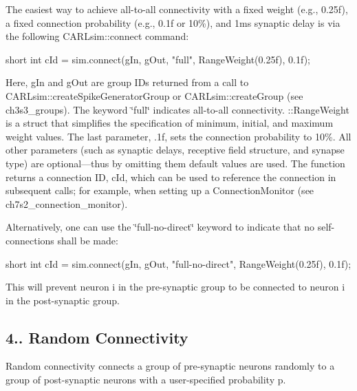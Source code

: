 The easiest way to achieve all-\/to-\/all connectivity with a fixed weight (e.\+g., 0.\+25f), a fixed connection probability (e.\+g., 0.\+1f or 10\%), and 1ms synaptic delay is via the following C\+A\+R\+Lsim\+::connect command\+: 
\begin{DoxyCode}
\textcolor{keywordtype}{short} \textcolor{keywordtype}{int} cId = sim.connect(gIn, gOut, \textcolor{stringliteral}{"full"}, RangeWeight(0.25f), 0.1f);
\end{DoxyCode}
 Here, {\ttfamily g\+In} and {\ttfamily g\+Out} are group I\+Ds returned from a call to C\+A\+R\+Lsim\+::create\+Spike\+Generator\+Group or C\+A\+R\+Lsim\+::create\+Group (see ch3s3\+\_\+groups). The keyword \char`\"{}full\char`\"{} indicates all-\/to-\/all connectivity. \+::\+Range\+Weight is a struct that simplifies the specification of minimum, initial, and maximum weight values. The last parameter, {.\+1f}, sets the connection probability to 10\%. All other parameters (such as synaptic delays, receptive field structure, and synapse type) are optional---thus by omitting them default values are used. The function returns a connection ID, {\ttfamily c\+Id}, which can be used to reference the connection in subsequent calls; for example, when setting up a Connection\+Monitor (see ch7s2\+\_\+connection\+\_\+monitor).

Alternatively, one can use the \char`\"{}full-\/no-\/direct\char`\"{} keyword to indicate that no self-\/connections shall be made\+: 
\begin{DoxyCode}
\textcolor{keywordtype}{short} \textcolor{keywordtype}{int} cId = sim.connect(gIn, gOut, \textcolor{stringliteral}{"full-no-direct"}, RangeWeight(0.25f), 0.1f);
\end{DoxyCode}
 This will prevent neuron {\ttfamily i} in the pre-\/synaptic group to be connected to neuron {\ttfamily i} in the post-\/synaptic group.\hypertarget{ch4_connections_ch4s1s6_random}{}\subsection{4.. Random Connectivity}\label{ch4_connections_ch4s1s6_random}
Random connectivity connects a group of pre-\/synaptic neurons randomly to a group of post-\/synaptic neurons with a user-\/specified probability p.

